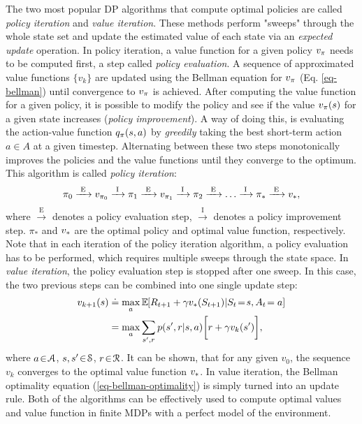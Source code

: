 \documentclass[a4paper, twoside, 12pt]{article}
\begin{document}
The two most popular DP algorithms that compute optimal policies are called
\emph{policy iteration} and \emph{value iteration}. These methods perform "sweeps" through
the whole state set and update the estimated value of each state via an
\emph{expected update} operation. In policy iteration, a value function for a given
policy \(\vpi\) needs to be computed first, a step called \emph{policy evaluation}. A
sequence of approximated value functions \(\{v_k\}\) are updated using the Bellman
equation for \(\vpi\) (Eq. \ref{eq-bellman}) until convergence to \(\vpi\) is
achieved. After computing the value function for a given policy, it is possible
to modify the policy and see if the value \(\vpi(s)\) for a given state increases
(\emph{policy improvement}). A way of doing this, is evaluating the action-value
function \(\qpi(s,a)\) by \emph{greedily} taking the best short-term action \(a\!\in\!A\)
at a given timestep. Alternating between these two steps monotonically improves
the policies and the value functions until they converge to the optimum. This
algorithm is called \emph{policy iteration}:
\begin{equation}
    \pi_0 \xrightarrow{\text{ E }} v_{\pi_0} \xrightarrow{\text{ I }}
    \pi_1 \xrightarrow{\text{ E }} v_{\pi_1} \xrightarrow{\text{ I }}
    \pi_2 \xrightarrow{\text{ E }} \hdots \xrightarrow{\text{ I }}
    \pi_* \xrightarrow{\text{ E }} \vstar,
\end{equation}
where \(\xrightarrow{\text{ E }}\) denotes a policy evaluation step,
\(\xrightarrow{\text{ I }}\) denotes a policy improvement step. \(\pi_*\) and
\(\vstar\) are the optimal policy and optimal value function, respectively. Note
that in each iteration of the policy iteration algorithm, a policy evaluation
has to be performed, which requires multiple sweeps through the state space. In
\emph{value iteration}, the policy evaluation step is stopped after one sweep. In
this case, the two previous steps can be combined into one single update step:
\begin{equation}
\begin{split}
    v_{k+1}(s) &\defeq \max_a \EE{}{R_{t+1}+\gamma \vstar(S_{t+1})|S_t\!=\!s, A_t\!=a} \\
    &= \max_{a}\sum_{s',r}{p(s',r|s,a)}\bigg[r+\gamma v_k(s')\bigg],
\end{split}
\end{equation}
where \(a\!\in\!\A\), \(s,s'\!\in\!\S\), \(r\!\in\!\R\). It can be shown, that for any
given \(v_0\), the sequence \({v_k}\) converges to the optimal value function
\({\vstar}\). In value iteration, the Bellman optimality equation
(\ref{eq-bellman-optimality}) is simply turned into an update rule. Both of the
algorithms can be effectively used to compute optimal values and value function
in finite MDPs with a perfect model of the environment.
\end{document}
